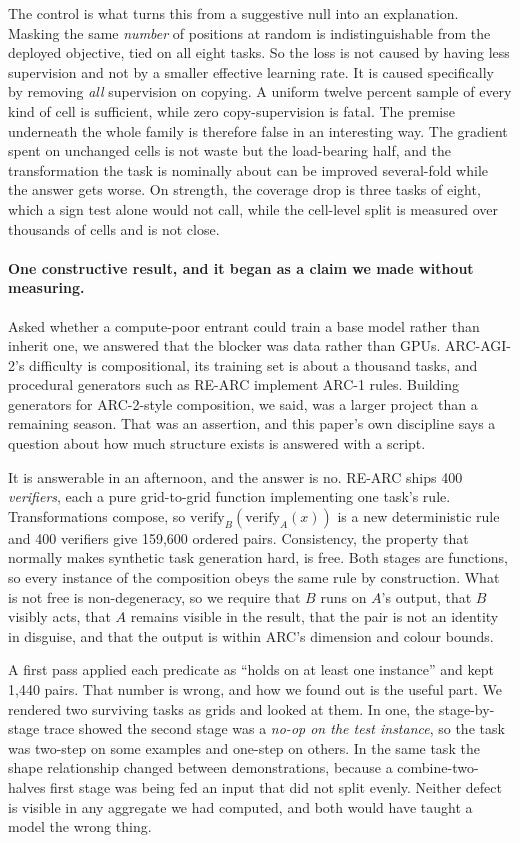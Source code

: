 \documentclass[11pt]{article}
\begin{document}
The control is what turns this from a suggestive null into an explanation. Masking the same
\emph{number} of positions at random is indistinguishable from the deployed objective, tied on all
eight tasks. So the loss is not caused by having less supervision and not by a smaller effective
learning rate. It is caused specifically by removing \emph{all} supervision on copying. A uniform
twelve percent sample of every kind of cell is sufficient, while zero copy-supervision is fatal. The
premise underneath the whole family is therefore false in an interesting way. The gradient spent on
unchanged cells is not waste but the load-bearing half, and the transformation the task is
nominally about can be improved several-fold while the answer gets worse. On
strength, the coverage drop is three tasks of eight, which a sign test alone would not call, while
the cell-level split is measured over thousands of cells and is not close.

\paragraph{One constructive result, and it began as a claim we made without measuring.} Asked whether
a compute-poor entrant could train a base model rather than inherit one, we answered that the blocker
was data rather than GPUs. ARC-AGI-2's difficulty is compositional, its training set is about a
thousand tasks, and procedural generators such as RE-ARC implement ARC-1 rules. Building generators
for ARC-2-style composition, we said, was a larger project than a remaining season. That was an
assertion, and this paper's own discipline says a question about how much structure exists is
answered with a script.

It is answerable in an afternoon, and the answer is no. RE-ARC ships 400 \emph{verifiers}, each a
pure grid-to-grid function implementing one task's rule. Transformations compose, so
$\mathrm{verify}_B(\mathrm{verify}_A(x))$ is a new deterministic rule and 400 verifiers give 159{,}600
ordered pairs. Consistency, the property that normally makes synthetic task generation hard, is free.
Both stages are functions, so every instance of the composition obeys the same rule by construction.
What is not free is non-degeneracy, so we require that $B$ runs on $A$'s output, that $B$ visibly
acts, that $A$ remains visible in the result, that the pair is not an identity in disguise, and that
the output is within ARC's dimension and colour bounds.

A first pass applied each predicate as ``holds on at least one instance'' and kept 1{,}440 pairs.
That number is wrong, and how we found out is the useful part. We rendered two surviving tasks as
grids and looked at them. In one, the stage-by-stage trace showed the second stage was a
\emph{no-op on the test instance}, so the task was two-step on some examples and one-step on others.
In the same task the shape relationship changed between demonstrations, because a
combine-two-halves first stage was being fed an input that did not split evenly. Neither defect is
visible in any aggregate we had computed, and both would have taught a model the wrong thing.
\end{document}
